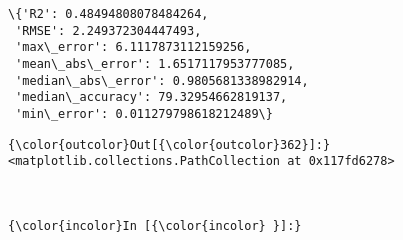 \documentclass[11pt]{article}
\begin{document}
    \begin{Verbatim}[commandchars=\\\{\}]
\{'R2': 0.48494808078484264,
 'RMSE': 2.249372304447493,
 'max\_error': 6.1117873112159256,
 'mean\_abs\_error': 1.6517117953777085,
 'median\_abs\_error': 0.9805681338982914,
 'median\_accuracy': 79.32954662819137,
 'min\_error': 0.011279798618212489\}

    \end{Verbatim}

\begin{Verbatim}[commandchars=\\\{\}]
{\color{outcolor}Out[{\color{outcolor}362}]:} <matplotlib.collections.PathCollection at 0x117fd6278>
\end{Verbatim}
            
    \begin{center}
    \end{center}
    { \hspace*{\fill} \\}
    
    \begin{Verbatim}[commandchars=\\\{\}]
{\color{incolor}In [{\color{incolor} }]:} 
\end{Verbatim}


    
    
    
    
\end{document}
